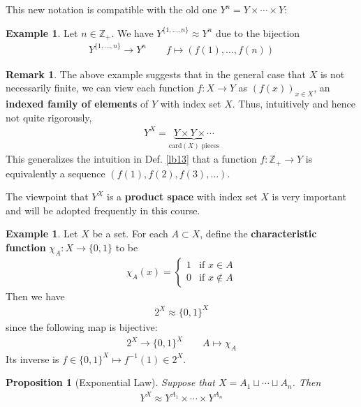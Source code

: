 \documentclass[12pt,b5paper,notitlepage]{article}
\theoremstyle{definition}
\newtheorem{eg}[df]{Example}
\newtheorem{rem}[df]{Remark}
\theoremstyle{plain}
\newtheorem{pp}[df]{Proposition}
\newcommand{\Zbb}{\mathbb Z}
\newcommand{\card}{\mathrm{card}}
\numberwithin{equation}{section}
\begin{document}
This new notation is compatible with the old one $Y^n=Y\times\cdots\times Y$:
\begin{eg}
Let $n\in\Zbb_+$. We have $Y^{\{1,\dots,n\}}\approx Y^n$ due to the bijection
\begin{align*}
Y^{\{1,\dots,n\}}\rightarrow Y^n\qquad f\mapsto (f(1),\dots,f(n))
\end{align*}
\end{eg}

\begin{rem}
The above example suggests that in the general case that $X$ is not necessarily finite, we can view each function $f:X\rightarrow Y$ as $(f(x))_{x\in X}$, an \textbf{indexed family of elements} of $Y$ with index set $X$. Thus, intuitively and hence not quite rigorously, 
\begin{align}
Y^X=\underbrace{Y\times Y\times\cdots}_{\card(X)\text{ pieces}} \label{eq11}
\end{align}
This generalizes the intuition in Def. \ref{lb13} that a function $f:\Zbb_+\rightarrow Y$ is equivalently a sequence $(f(1),f(2),f(3),\dots)$.

The viewpoint that $Y^X$ is a \textbf{product space} with index set $X$ is very important and will be adopted frequently in this course. \hfill\qedsymbol
\end{rem}



\begin{eg}\label{lb11}
Let $X$ be a set. For each $A\subset X$, define the \textbf{characteristic function}   $\chi_A:X\rightarrow\{0,1\}$ to be
\begin{align*}
\chi_A(x)=\left\{
\begin{array}{ll}
1&\text{if }x\in A\\
0&\text{if }x\notin A
\end{array}
\right.
\end{align*}
Then we have
\begin{align*}
2^X\approx \{0,1\}^X
\end{align*}
since the following map is bijective:
\begin{gather*}
2^X\rightarrow\{0,1\}^X\qquad A\mapsto\chi_A
\end{gather*}
Its inverse is $f\in\{0,1\}^X\mapsto f^{-1}(1)\in 2^X$.
\end{eg}

\begin{pp}[Exponential Law]\label{lb10}
Suppose that $X=A_1\sqcup\cdots\sqcup A_n$. Then
\begin{align*}
Y^X\approx Y^{A_1}\times \cdots\times Y^{A_n}
\end{align*}
\end{pp}
\end{document}
